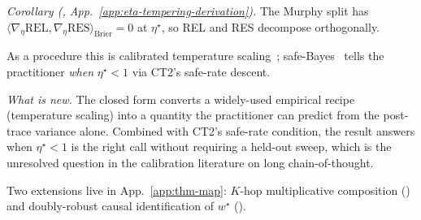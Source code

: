 \noindent\emph{Corollary (, App.~\ref{app:eta-tempering-derivation}).} The Murphy split has $\langle\nabla_\eta\mathrm{REL},\nabla_\eta\mathrm{RES}\rangle_{\mathrm{Brier}}\!=\!0$ at $\eta^\star$, so REL and RES decompose orthogonally.\label{cor:brier-orthogonality-body}

As a procedure this is calibrated temperature scaling~\citep{guo2017oncalibration}; safe-Bayes~\citep{bissiri2016,grunwald2017} tells the practitioner \emph{when} $\eta^\star\!<\!1$ via CT2's safe-rate descent.

\textit{What is new.} The closed form converts a widely-used empirical recipe (temperature scaling) into a quantity the practitioner can predict from the post-trace variance alone. Combined with CT2's safe-rate condition, the result answers when $\eta^\star\!<\!1$ is the right call without requiring a held-out sweep, which is the unresolved question in the calibration literature on long chain-of-thought.

Two extensions live in App.~\ref{app:thm-map}: $K$-hop multiplicative composition () and doubly-robust causal identification of $w^\star$ ().

